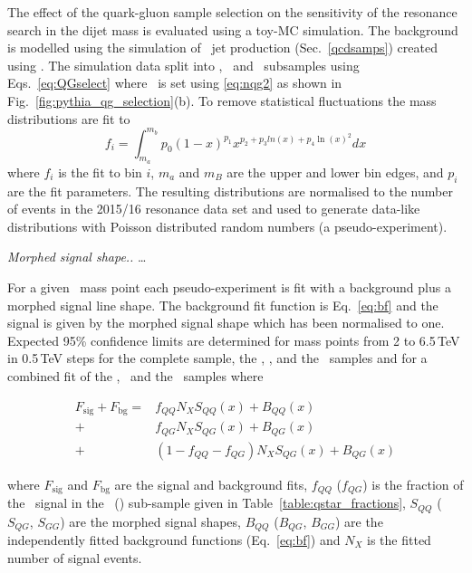 
The effect of the quark-gluon sample selection on the sensitivity of the resonance search in the 
dijet mass is evaluated using a toy-MC simulation. The background is modelled using the simulation of \QCD\
jet production (Sec.~\ref{qcdsamps}) created using  . The simulation data split into \QQ, \QG\ and \GG\
subsamples using Eqs.~\ref{eq:QGselect} where \nqg\ is set using \ref{eq:nqg2} as shown 
in Fig.~\ref{fig:pythia_qg_selection}(b). To remove statistical fluctuations the mass distributions are fit to
\begin{equation}
f_i = \int_{m_a}^{m_b} p_0 \left(1 -x \right)^{p_1} x^{p_2 + p_3 ln(x) + p_4 \ln(x)^2  } dx
\label{eq:bf}
\end{equation}
where $f_i$ is the fit to bin $i$, $m_a$ and $m_B$ are the upper and lower bin edges, and $p_i$ are the fit parameters. 
The resulting distributions are normalised to the number of events in the 2015/16 resonance data set 
and used to generate data-like distributions with Poisson distributed random numbers (a pseudo-experiment). 

\textit{\color{red} Morphed signal shape.. } \ldots

For a given \qstar\ mass point each pseudo-experiment is fit with a background plus a morphed signal line shape. 
The background fit function is Eq.~\ref{eq:bf} and the signal is given by the morphed signal shape which has
been normalised to one. Expected 95\% confidence limits are determined for mass points from 2 to 6.5\,TeV in 0.5\,TeV
steps for the complete sample, the \QQ, \QG, and the \GG\ samples and for a combined fit of the \QQ, \QG\ 
and the \GG\ samples where 
\begin{linenomath}
\begin{align}
F_{\mathrm{sig}} + F_{\mathrm{bg}} ={}&  f_{QQ} N_X S_{QQ}(x) + B_{QQ}(x)  \nonumber \\
								   +{}&  f_{QG} N_X S_{QG}(x) + B_{QG}(x) \nonumber \\
								   +{}&  (1 - f_{QQ} -f_{QG})   N_X S_{QG}(x) + B_{QG}(x) 
\end{align}
\end{linenomath}
where $F_{\mathrm{sig}}$ and $F_{\mathrm{bg}}$ are the signal and background fits, $f_{QQ}$ ($f_{QG}$) is the 
fraction of the \qstar\ signal in the \QQ\ (\QG ) sub-sample given in Table~\ref{table:qstar_fractions}, $S_{QQ}$ 
($S_{QG}$, $S_{GG}$) 
are the morphed signal shapes, $B_{QQ}$ ($B_{QG}$, $B_{GG}$) are the independently fitted background functions  (Eq.~\ref{eq:bf}) and
$N_X$ is the fitted number of signal events. 

